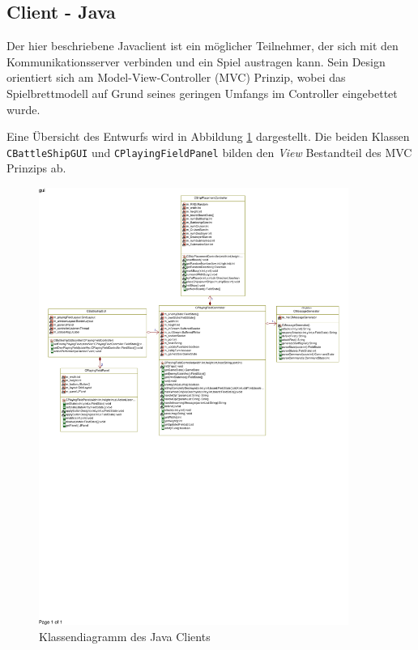 \subsection{Client - Java}
\label{sec:Javaclient}

Der hier beschriebene Javaclient ist ein möglicher Teilnehmer, der sich mit den Kommunikationsserver verbinden und ein Spiel austragen kann.
Sein Design orientiert sich am Model-View-Controller (MVC) Prinzip, wobei das Spielbrettmodell auf Grund seines geringen Umfangs im Controller eingebettet wurde.

Eine Übersicht des Entwurfs wird in Abbildung \ref{fig:Javaclientklassendiagramm} dargestellt.
Die beiden Klassen \texttt{CBattleShipGUI} und \texttt{CPlayingFieldPanel} bilden den \emph{View} Bestandteil des MVC Prinzips ab.

\begin{figure}[H]
  \centering
  \includegraphics[trim=5mm 125mm 5mm 4mm,clip,width=0.9\textwidth]{images/CJavaClient.pdf}
  \caption{Klassendiagramm des Java Clients}
  \label{fig:Javaclientklassendiagramm}
\end{figure}

